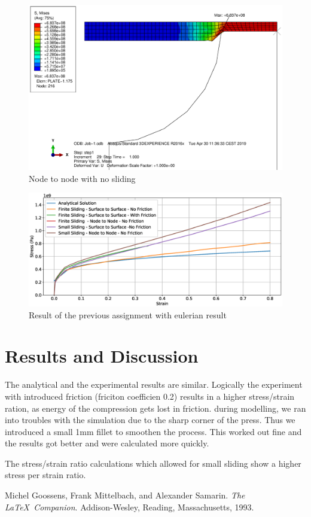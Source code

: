 \documentclass[12pt]{article}
\begin{document}
\begin{figure}[!htb]
  \centering
  \includegraphics[width=0.9\linewidth]{pics/node_to_node_no_sliding}
  \caption{Node to node with no sliding}
  \label{fig:2}
\end{figure}

\begin{figure}[!htb]
  \centering
  \includegraphics[width=0.9\linewidth]{pics/analytical_compared}
  \caption{Result of the previous assignment with eulerian result}
  \label{fig:2}
\end{figure}


\pagebreak
\section{Results and Discussion}

The analytical and the experimental results are similar.
Logically the experiment with introduced friction (friciton coefficien 0.2) results in a higher
stress/strain ration, as energy of the compression gets lost in friction. 
during modelling, we ran into troubles with the simulation due to the sharp corner of the press.
Thus we introduced a small 1mm fillet to smoothen the process. This worked out fine and the results 
got better and were calculated more quickly.

The stress/strain ratio calculations which allowed for small sliding show a higher stress per strain ratio.


\pagebreak
\begin{thebibliography}{9}
  Michel Goossens, Frank Mittelbach, and Alexander Samarin. 
  \textit{The \LaTeX\ Companion}. 
  Addison-Wesley, Reading, Massachusetts, 1993.
\end{thebibliography}
\end{document}
